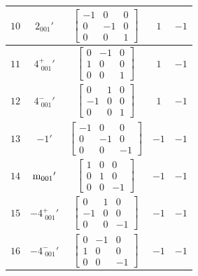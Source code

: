 \documentclass[fleqn,8pt]{jsarticle}
\begin{document}
\begin{longtable}{ccccc}
$ 10 $ & $ 2{}_{001}{}' $ & $ \begin{bmatrix} -1 & 0 & 0 \\ 0 & -1 & 0 \\ 0 & 0 & 1 \end{bmatrix} $ & $ 1 $ & $ -1 $ \\ \hline
$ 11 $ & $ 4^{+}_{\,\,001}{}' $ & $ \begin{bmatrix} 0 & -1 & 0 \\ 1 & 0 & 0 \\ 0 & 0 & 1 \end{bmatrix} $ & $ 1 $ & $ -1 $ \\ \hline
$ 12 $ & $ 4^{-}_{\,\,001}{}' $ & $ \begin{bmatrix} 0 & 1 & 0 \\ -1 & 0 & 0 \\ 0 & 0 & 1 \end{bmatrix} $ & $ 1 $ & $ -1 $ \\ \hline
$ 13 $ & $ -1{}' $ & $ \begin{bmatrix} -1 & 0 & 0 \\ 0 & -1 & 0 \\ 0 & 0 & -1 \end{bmatrix} $ & $ -1 $ & $ -1 $ \\ \hline
$ 14 $ & $ {\rm m}_{001}{}' $ & $ \begin{bmatrix} 1 & 0 & 0 \\ 0 & 1 & 0 \\ 0 & 0 & -1 \end{bmatrix} $ & $ -1 $ & $ -1 $ \\ \hline
$ 15 $ & $ -4^{+}_{\,\,001}{}' $ & $ \begin{bmatrix} 0 & 1 & 0 \\ -1 & 0 & 0 \\ 0 & 0 & -1 \end{bmatrix} $ & $ -1 $ & $ -1 $ \\ \hline
$ 16 $ & $ -4^{-}_{\,\,001}{}' $ & $ \begin{bmatrix} 0 & -1 & 0 \\ 1 & 0 & 0 \\ 0 & 0 & -1 \end{bmatrix} $ & $ -1 $ & $ -1 $ \\
\end{longtable}
\end{document}
